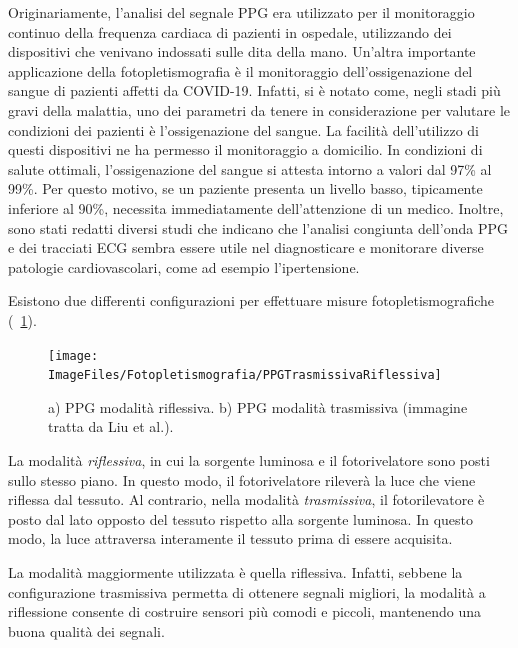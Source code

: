 Originariamente, l'analisi del segnale PPG era utilizzato per il monitoraggio continuo della frequenza cardiaca di pazienti in ospedale, utilizzando dei dispositivi che venivano indossati sulle dita della mano. Un'altra importante applicazione della fotopletismografia è il monitoraggio dell'ossigenazione del sangue di pazienti affetti da COVID-19. Infatti, si è notato come, negli stadi più gravi della malattia, uno dei parametri da tenere in considerazione per valutare le condizioni dei pazienti è l'ossigenazione del sangue. La facilità dell'utilizzo di questi dispositivi ne ha permesso il monitoraggio a domicilio. In condizioni di salute ottimali, l'ossigenazione del sangue si attesta intorno a valori dal 97\% al 99\%. Per questo motivo, se un paziente presenta un livello basso, tipicamente inferiore al 90\%, necessita immediatamente dell'attenzione di un medico. Inoltre, sono stati redatti diversi studi che indicano che l'analisi congiunta dell'onda PPG e dei tracciati ECG sembra essere utile nel diagnosticare e monitorare diverse patologie cardiovascolari, come ad esempio l'ipertensione\cite{Elgendi2019}. 

Esistono due differenti configurazioni per effettuare misure fotopletismografiche (\Fig~\ref{fig:PPGTrasmissivaRiflessiva}).
\begin{figure}[htb]        
	\centering
	\texttt{[image: ImageFiles/Fotopletismografia/PPGTrasmissivaRiflessiva]}
	\caption{a) PPG modalità riflessiva. b) PPG modalità trasmissiva (immagine tratta da Liu et al.\cite{Liu2020}).}
	\label{fig:PPGTrasmissivaRiflessiva}
\end{figure}

La modalità \textit{riflessiva}, in cui la sorgente luminosa e il fotorivelatore sono posti sullo stesso piano. In questo modo, il fotorivelatore rileverà la luce che viene riflessa dal tessuto. Al contrario, nella modalità \textit{trasmissiva}, il fotorilevatore è posto dal lato opposto del tessuto rispetto alla sorgente luminosa. In questo modo, la luce attraversa interamente il tessuto prima di essere acquisita. 

La modalità maggiormente utilizzata è quella riflessiva.  Infatti, sebbene la configurazione trasmissiva permetta di ottenere segnali migliori, la modalità a riflessione consente di costruire sensori più comodi e piccoli, mantenendo una buona qualità dei segnali.

